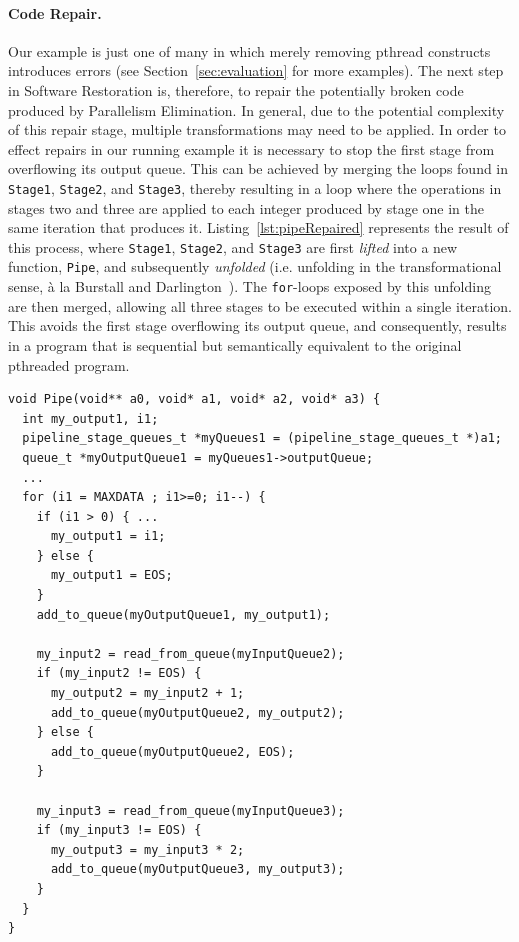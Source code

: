 \paragraph{Code Repair.}
%
Our example is just one of many in which merely removing pthread constructs introduces errors (see Section~\ref{sec:evaluation} for more examples). The next step in Software Restoration is, therefore, to repair the potentially broken code produced by Parallelism Elimination. In general, due to the potential complexity of this repair stage, multiple transformations may need to be applied.
In order to effect repairs in our running example it is necessary to stop the first stage from overflowing its output queue. This can be achieved by merging the loops found in \lstinline|Stage1|, \lstinline|Stage2|, and \lstinline|Stage3|, thereby resulting in a loop where the operations in stages two and three are applied to each integer produced by stage one in the same iteration that produces it. Listing~\ref{lst:pipeRepaired} represents the result of this process, where \lstinline|Stage1|, \lstinline|Stage2|, and \lstinline|Stage3| are first \emph{lifted} into a new function, \lstinline|Pipe|, and subsequently \emph{unfolded} (i.e. unfolding in the transformational sense, \`{a} la Burstall and Darlington~\cite{darlington77}). The \lstinline|for|-loops exposed by this unfolding are then merged, allowing all three stages to be executed within a single iteration. This avoids the first stage overflowing its output queue, and consequently, results in a program that is sequential but semantically equivalent to the original pthreaded program.


\begin{lstlisting}[caption=Simple Pipeline Code after Code Repair, label=lst:pipeRepaired]
void Pipe(void** a0, void* a1, void* a2, void* a3) {
  int my_output1, i1;
  pipeline_stage_queues_t *myQueues1 = (pipeline_stage_queues_t *)a1;
  queue_t *myOutputQueue1 = myQueues1->outputQueue;
  ...
  for (i1 = MAXDATA ; i1>=0; i1--) {
    if (i1 > 0) { ...
      my_output1 = i1;
    } else {
      my_output1 = EOS;
    }
    add_to_queue(myOutputQueue1, my_output1);

    my_input2 = read_from_queue(myInputQueue2);
    if (my_input2 != EOS) {
      my_output2 = my_input2 + 1;
      add_to_queue(myOutputQueue2, my_output2);
    } else {
      add_to_queue(myOutputQueue2, EOS);
    }

    my_input3 = read_from_queue(myInputQueue3);
    if (my_input3 != EOS) {
      my_output3 = my_input3 * 2;
      add_to_queue(myOutputQueue3, my_output3);
    }
  }
}
\end{lstlisting}

